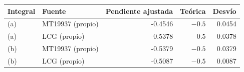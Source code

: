 \begin{tabular}{llrrr}
\toprule
Integral & Fuente & Pendiente ajustada & Teórica & Desvío \\
\midrule
(a) & MT19937 (propio) & -0.4546 & $-0.5$ & 0.0454 \\
(a) & LCG (propio) & -0.5378 & $-0.5$ & 0.0378 \\
(b) & MT19937 (propio) & -0.5379 & $-0.5$ & 0.0379 \\
(b) & LCG (propio) & -0.5087 & $-0.5$ & 0.0087 \\
\bottomrule
\end{tabular}

